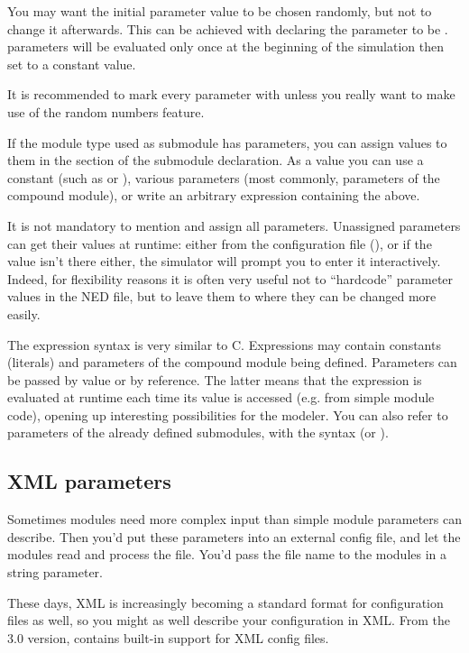 You may want the initial parameter value to be chosen randomly, but not
to change it afterwards. This can be achieved with declaring the parameter
to be .  parameters will be evaluated only once
at the beginning of the simulation then set to a constant value.

It is recommended to mark every parameter with  unless
you really want to make use of the random numbers feature.



If the module type used as submodule has parameters, you can assign
values to them in the  section of the submodule
declaration.
As a value you can use a constant (such as  or
), various parameters (most commonly, parameters
of the compound module), or write an arbitrary expression containing
the above.

It is not mandatory to mention and assign all parameters.
Unassigned parameters can get their values at runtime: either from
the configuration file (), or if the value
isn't there either, the simulator will prompt you to enter it
interactively. Indeed, for flexibility reasons it is often very useful
not to ``hardcode'' parameter values in the NED file,
but to leave them to  where they can be
changed more easily.

The expression syntax  is very similar to C.
Expressions may contain constants (literals) and parameters of the
compound module being defined. Parameters can be passed by value
or by reference. The latter means that the expression is evaluated
at runtime each time its value is accessed (e.g. from simple module
code), opening up interesting possibilities for the modeler.
You can also refer to parameters of the already defined submodules,
with the syntax 
(or ).


\subsection{XML parameters}

Sometimes modules need more complex input than simple module parameters
can describe. Then you'd put these parameters into an external config file,
and let the modules read and process the file. You'd pass the file name
to the modules in a string parameter.

These days, XML is increasingly becoming a standard format for configuration
files as well, so you might as well describe your configuration in XML.
From the 3.0 version, {\opp} contains built-in support for XML config files.

